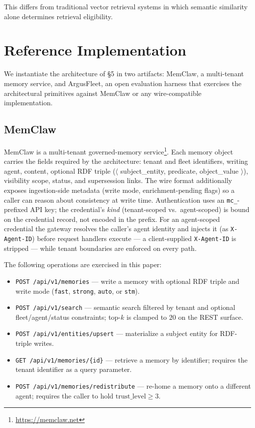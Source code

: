 \documentclass[10pt,twocolumn,letterpaper]{article}
\begin{document}
This differs from traditional vector retrieval systems in which semantic similarity alone determines retrieval eligibility.

\section{Reference Implementation}
\label{sec:impl}

We instantiate the architecture of \S5 in two artifacts: MemClaw, a multi-tenant memory service, and ArgusFleet, an open evaluation harness that exercises the architectural primitives against MemClaw or any wire-compatible implementation.

\subsection{MemClaw}

MemClaw is a multi-tenant governed-memory service\footnote{\url{https://memclaw.net}}. Each memory object carries the fields required by the architecture: tenant and fleet identifiers, writing agent, content, optional RDF triple (\(\langle\) subject\_entity, predicate, object\_value \(\rangle\)), visibility scope, status, and supersession links. The wire format additionally exposes ingestion-side metadata (write mode, enrichment-pending flags) so a caller can reason about consistency at write time. Authentication uses an \texttt{mc\_}-prefixed API key; the credential's \emph{kind} (tenant-scoped vs.\ agent-scoped) is bound on the credential record, not encoded in the prefix. For an agent-scoped credential the gateway resolves the caller's agent identity and injects it (as \texttt{X-Agent-ID}) before request handlers execute --- a client-supplied \texttt{X-Agent-ID} is stripped --- while tenant boundaries are enforced on every path.

The following operations are exercised in this paper:
\begin{itemize}
    \item \texttt{POST /api/v1/memories} --- write a memory with optional RDF triple and write mode (\texttt{fast}, \texttt{strong}, \texttt{auto}, or \texttt{stm}).
    \item \texttt{POST /api/v1/search} --- semantic search filtered by tenant and optional fleet/agent/status constraints; top-\(k\) is clamped to \(20\) on the REST surface.
    \item \texttt{POST /api/v1/entities/upsert} --- materialize a subject entity for RDF-triple writes.
    \item \texttt{GET /api/v1/memories/\{id\}} --- retrieve a memory by identifier; requires the tenant identifier as a query parameter.
    \item \texttt{POST /api/v1/memories/redistribute} --- re-home a memory onto a different agent; requires the caller to hold \(\text{trust\_level} \ge 3\).
\end{itemize}
\end{document}
